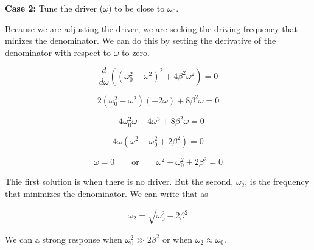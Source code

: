 \documentclass[11pt]{article}
\makeatletter
\newcommand{\boxspacing}{\kern\kvtcb@left@rule\kern\kvtcb@boxsep}
\newcommand{\prompt}[4]{
        {\ttfamily\llap{{\color{#2}[#3]:\hspace{3pt}#4}}\vspace{-\baselineskip}}
    }
\makeatother
\begin{document}
\textbf{Case 2:} Tune the driver (\(\omega\)) to be close to
\(\omega_0\).

Because we are adjusting the driver, we are seeking the driving
frequency that minizes the denominator. We can do this by setting the
derivative of the denominator with respect to \(\omega\) to zero.

\[\dfrac{d}{d\omega} \left(\left(\omega_0^2 - \omega^2\right)^2 + 4\beta^2 \omega^2\right) = 0\]

\[2\left(\omega_0^2 - \omega^2\right) \left(-2\omega\right) + 8\beta^2 \omega = 0\]

\[-4\omega_0^2 \omega + 4\omega^3 + 8\beta^2 \omega = 0\]

\[4\omega\left(\omega^2 - \omega_0^2 + 2\beta^2\right) = 0\]

\[\omega = 0 \qquad \text{or} \qquad \omega^2 - \omega_0^2 + 2\beta^2 = 0\]

Thie first solution is when there is no driver. But the second,
\(\omega_2\), is the frequency that minimizes the denominator. We can
write that as

\[\omega_2 = \sqrt{\omega_0^2 - 2\beta^2}\]

We can a strong response when \(\omega_0^2 \gg 2\beta^2\) or when
\(\omega_2 \approx \omega_0\).

    \begin{tcolorbox}[breakable, size=fbox, boxrule=1pt, pad at break*=1mm,colback=cellbackground, colframe=cellborder]
\prompt{In}{incolor}{ }{\boxspacing}
\begin{Verbatim}[commandchars=\\\{\}]

\end{Verbatim}
\end{tcolorbox}

    

    


    
    
    
\end{document}
